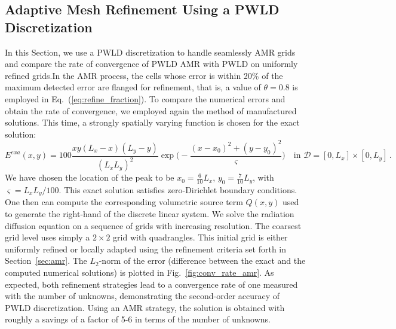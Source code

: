 \documentclass[preprint,10pt]{elsarticle}
\newcommand{\D}{\mathcal{D}}
\newcommand{\eqt}[1]{Eq.~(\ref{#1})}                     %
\newcommand{\fig}[1]{Fig.~\ref{#1}}                      %
\newcommand{\sct}[1]{Section~\ref{#1}}                   %
\begin{document}
\subsection{Adaptive Mesh Refinement Using a PWLD Discretization}

In this Section, we use a PWLD discretization to handle seamlessly AMR grids and compare the rate
of convergence of PWLD AMR with PWLD on uniformly refined grids.In the AMR process, the cells whose
error is within 20\% of the maximum detected error are flanged for refinement, that is, a value of 
$\theta=0.8$ is employed in \eqt{eq:refine_fraction}.
To compare the numerical errors and obtain the rate of convergence, we employed again the method of 
manufactured solutions. This time, a strongly spatially varying function is chosen
for the exact solution:
\begin{equation}
	E^{\textit{exa}}(x,y) = 100 \frac{xy(L_x-x)(L_y-y)}{(L_x L_y)^2}\exp\Big(-\frac{(x-x_0)^2+(y-y_0)^2}{\varsigma}\Big)
	 \quad \text{in } \D=[0,L_x]\times [0,L_y] \,.
\end{equation}
We have chosen the location of the peak to be $x_0=\tfrac{6}{10}L_x$, $y_0=\tfrac{7}{10}L_y$, with $\varsigma=L_xL_y/100$. 
This exact solution satisfies zero-Dirichlet boundary conditions. One then can compute 
the corresponding volumetric source term $Q(x,y)$ used to generate the right-hand of the discrete linear system. 
We solve the radiation diffusion equation on a sequence of grids with increasing resolution. The coarsest grid level
uses simply a $2\times 2$ grid with quadrangles. This initial grid is either uniformly refined or locally adapted 
using the refinement criteria set forth in \sct{sec:amr}. The $L_2$-norm of the error (difference
between the exact and the computed numerical solutions) is plotted in \fig{fig:conv_rate_amr}. As expected, both refinement
strategies lead to a convergence rate of one measured with the number of unknowns, demonstrating the 
second-order accuracy of PWLD discretization. Using an AMR strategy, the solution is obtained with roughly a savings of
a factor of 5-6 in terms of the number of unknowns. 
\end{document}
